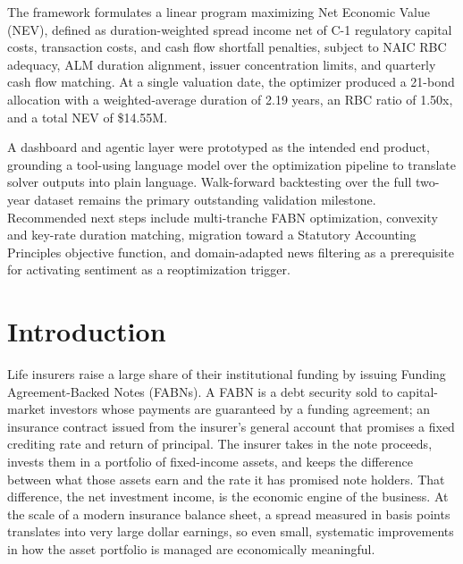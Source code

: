 \documentclass[12pt]{article}
\begin{document}
The framework formulates a linear program maximizing Net Economic Value (NEV), defined as duration-weighted spread income net of C-1 regulatory capital costs, transaction costs, and cash flow shortfall penalties, subject to NAIC RBC adequacy, ALM duration alignment, issuer concentration limits, and quarterly cash flow matching. At a single valuation date, the optimizer produced a 21-bond allocation with a weighted-average duration of 2.19 years, an RBC ratio of 1.50x, and a total NEV of \$14.55M.

A dashboard and agentic layer were prototyped as the intended end product, grounding a tool-using language model over the optimization pipeline to translate solver outputs into plain language. Walk-forward backtesting over the full two-year dataset remains the primary outstanding validation milestone. Recommended next steps include multi-tranche FABN optimization, convexity and key-rate duration matching, migration toward a Statutory Accounting Principles objective function, and domain-adapted news filtering as a prerequisite for activating sentiment as a reoptimization trigger.

\newpage
\setcounter{tocdepth}{2}
\setcounter{page}{3}
\tableofcontents
\listoffigures
\listoftables

\newpage
{}
\setcounter{page}{1}

\section{Introduction}

Life insurers raise a large share of their institutional funding by issuing Funding Agreement-Backed Notes (FABNs). A FABN is a debt security sold to capital-market investors whose payments are guaranteed by a funding agreement; an insurance contract issued from the insurer's general account that promises a fixed crediting rate and return of principal. The insurer takes in the note proceeds, invests them in a portfolio of fixed-income assets, and keeps the difference between what those assets earn and the rate it has promised note holders. That difference, the net investment income, is the economic engine of the business. At the scale of a modern insurance balance sheet, a spread measured in basis points translates into very large dollar earnings, so even small, systematic improvements in how the asset portfolio is managed are economically meaningful.
\end{document}
